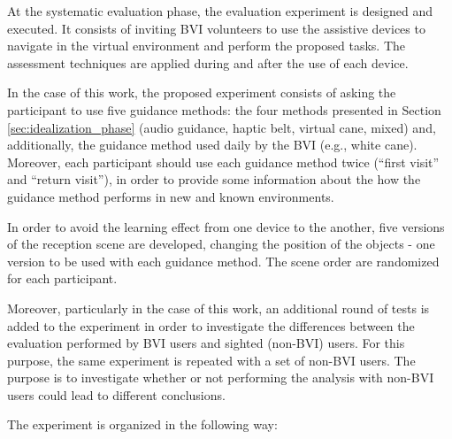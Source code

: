 At the systematic evaluation phase, the evaluation experiment is designed and executed. It consists of inviting BVI volunteers to use the assistive devices to navigate in the virtual environment and perform the proposed tasks. The assessment techniques are applied during and after the use of each device.

In the case of this work, the proposed experiment consists of asking the participant to use five guidance methods: the four methods presented in Section \ref{sec:idealization_phase} (audio guidance, haptic belt, virtual cane, mixed) and, additionally, the guidance method used daily by the BVI (e.g., white cane). Moreover, each participant should use each guidance method twice (“first visit” and “return visit”), in order to provide some information about the how the guidance method performs in new and known environments.

In order to avoid the learning effect from one device to the another, five versions of the reception scene are developed, changing the position of the objects - one version to be used with each guidance method. The scene order are randomized for each participant.

Moreover, particularly in the case of this work, an additional round of tests is added to the experiment in order to investigate the differences between the evaluation performed by BVI users and sighted (non-BVI) users. For this purpose, the same experiment is repeated with a set of non-BVI users. The purpose is to investigate whether or not performing the analysis with non-BVI users could lead to different conclusions.

The experiment is organized in the following way:

